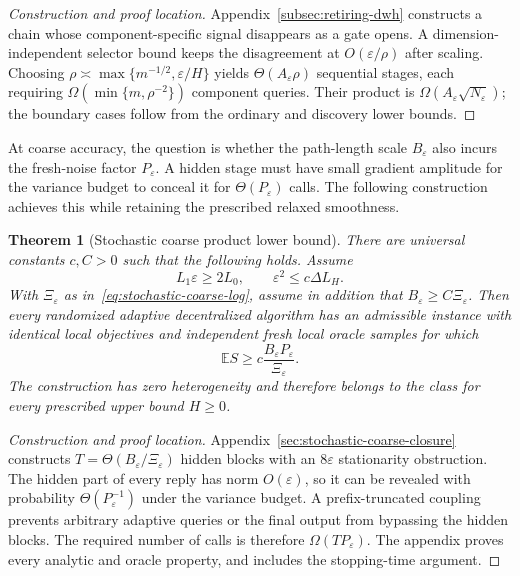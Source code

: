 \documentclass[11pt,a4paper]{article}
\newcommand{\E}{\mathbb{E}}
\newcommand{\eps}{\varepsilon}
\newtheorem{theorem}{Theorem}[section]
\theoremstyle{remark}
\begin{document}
\begin{proof}[Construction and proof location]
Appendix~\ref{subsec:retiring-dwh} constructs a chain whose component-specific
signal disappears as a gate opens. A dimension-independent selector bound
keeps the disagreement at $O(\eps/\rho)$ after scaling. Choosing
$\rho\asymp\max\{m^{-1/2},\eps/H\}$ yields
$\Theta(A_\eps\rho)$ sequential stages, each requiring
$\Omega(\min\{m,\rho^{-2}\})$ component queries. Their product is
$\Omega(A_\eps\sqrt{N_\eps})$; the boundary cases follow from the
ordinary and discovery lower bounds.
\end{proof}

At coarse accuracy, the question is whether the path-length scale
$B_\eps$ also incurs the fresh-noise factor $P_\eps$. A hidden stage must
have small gradient amplitude for the variance budget to conceal it for
$\Theta(P_\eps)$ calls. The following construction achieves this while
retaining the prescribed relaxed smoothness.

\begin{theorem}[Stochastic coarse product lower bound]
\label{thm:stochastic-coarse-product}
There are universal constants $c,C>0$ such that the following holds.  Assume
\begin{equation}
 L_1\eps\ge2L_0,
 \qquad
 \eps^2\le c\Delta L_H.
 \label{eq:stochastic-coarse-premise}
\end{equation}
With $\Xi_\eps$ as in~\eqref{eq:stochastic-coarse-log},
assume in addition that $B_\eps\ge C\Xi_\eps$.  Then every randomized
adaptive decentralized algorithm has an admissible
instance with identical local objectives and independent fresh local oracle
samples for which
\begin{equation}
 \boxed{
 \E S\ge
 c\frac{B_\eps P_\eps}{\Xi_\eps}.}
 \label{eq:BP-product-lower}
\end{equation}
The construction has zero heterogeneity and therefore belongs to the class
for every prescribed upper bound $H\ge0$.
\end{theorem}

\begin{proof}[Construction and proof location]
Appendix~\ref{sec:stochastic-coarse-closure} constructs
$T=\Theta(B_\eps/\Xi_\eps)$ hidden blocks with an $8\eps$ stationarity
obstruction. The hidden part of every reply has norm $O(\eps)$, so it can
be revealed with probability $\Theta(P_\eps^{-1})$ under the variance
budget. A prefix-truncated coupling prevents arbitrary adaptive queries or
the final output from bypassing the hidden blocks. The required number of
calls is therefore $\Omega(TP_\eps)$. The appendix proves every analytic
and oracle property, and includes the stopping-time argument.
\end{proof}
\end{document}
